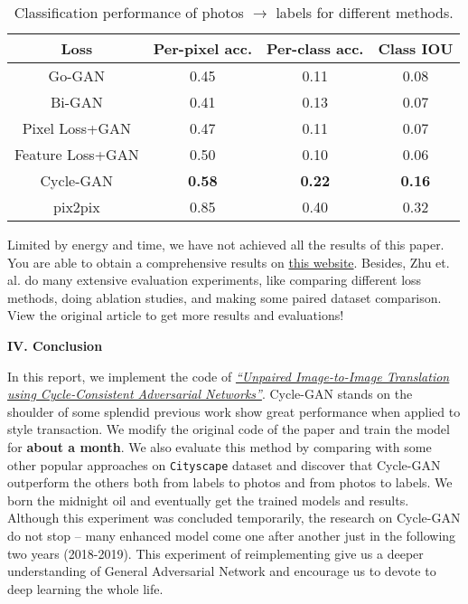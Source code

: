 \documentclass[a4paper]{article}
\renewcommand{\baselinestretch}{1.2}
\begin{document}
\begin{table} 
\begin{center}
\begin{tabular}{cccc} 
\hline
\textbf{Loss}& \textbf{Per-pixel acc.} & \textbf{Per-class acc.} &\textbf{Class IOU}\\
\hline
\textsf{Go-GAN}&0.45&0.11&0.08\\
\textsf{Bi-GAN}&0.41&0.13&0.07\\
\textsf{Pixel Loss}+\textsf{GAN}&0.47&0.11&0.07\\
\textsf{Feature Loss}+\textsf{GAN}&0.50&0.10&0.06\\
\textsf{Cycle-GAN}&\textbf{0.58}&\textbf{0.22}&\textbf{0.16}\\
\hline
\textsf{pix2pix}&0.85&0.40&0.32\\
\end{tabular}
\end{center}
\caption{Classification performance of photos $\to$ labels for different methods.}
\end{table}
\renewcommand{\baselinestretch}{1.0}
Limited by energy and time, we have not achieved all the results of this paper. You are able to obtain a comprehensive results on \href{https://junyanz.github.io/CycleGAN/}{this website}. Besides, Zhu et. al. do many extensive evaluation experiments, like comparing different loss methods, doing ablation studies, and making some paired dataset comparison. View the original article to get more results and evaluations!

\vspace{10mm}
\begin{center}
\LARGE\textbf{IV. Conclusion} \\
\end{center}
\vspace{2mm}

In this report, we implement the code of \href{https://arxiv.org/pdf/1703.10593.pdf}{\emph{``Unpaired Image-to-Image Translation using Cycle-Consistent Adversarial Networks''}}. \textsf{Cycle-GAN} stands on the shoulder of some splendid previous work show great performance when applied to style transaction. We modify the original code of the paper and train the model for \textbf{about a month}. We also evaluate this method by comparing with some other popular approaches on \texttt{Cityscape} dataset and discover that \textsf{Cycle-GAN} outperform the others both from labels to photos and from photos to labels. We born the midnight oil and eventually get the trained models and results. Although this experiment was concluded temporarily, the research on \textsf{Cycle-GAN} do not stop -- many enhanced model come one after another just in the following two years (2018-2019). This experiment of reimplementing give us a deeper understanding of General Adversarial Network and encourage us to devote to deep learning the whole life.
\end{document}
